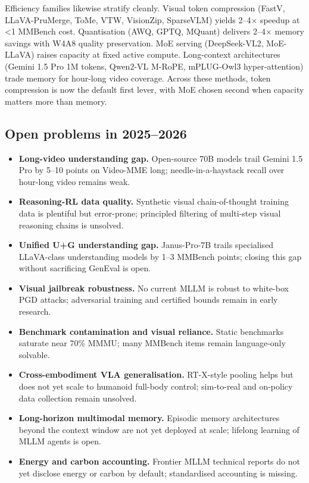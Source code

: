 \documentclass{article}
\begin{document}
Efficiency families likewise stratify cleanly. Visual token compression (FastV, LLaVA-PruMerge, ToMe, VTW, VisionZip, SparseVLM) yields 2--4× speedup at \textless1 MMBench cost. Quantisation (AWQ, GPTQ, MQuant) delivers 2--4× memory savings with W4A8 quality preservation. MoE serving (DeepSeek-VL2, MoE-LLaVA) raises capacity at fixed active compute. Long-context architectures (Gemini 1.5 Pro 1M tokens, Qwen2-VL M-RoPE, mPLUG-Owl3 hyper-attention) trade memory for hour-long video coverage. Across these methods, token compression is now the default first lever, with MoE chosen second when capacity matters more than memory.

\subsection{Open problems in 2025--2026}\label{open-problems-in-20252026}

\begin{itemize}

\item
  \textbf{Long-video understanding gap.} Open-source 70B models trail Gemini 1.5 Pro by 5--10 points on Video-MME long; needle-in-a-haystack recall over hour-long video remains weak.
\item
  \textbf{Reasoning-RL data quality.} Synthetic visual chain-of-thought training data is plentiful but error-prone; principled filtering of multi-step visual reasoning chains is unsolved.
\item
  \textbf{Unified U+G understanding gap.} Janus-Pro-7B trails specialised LLaVA-class understanding models by 1--3 MMBench points; closing this gap without sacrificing GenEval is open.
\item
  \textbf{Visual jailbreak robustness.} No current MLLM is robust to white-box PGD attacks; adversarial training and certified bounds remain in early research.
\item
  \textbf{Benchmark contamination and visual reliance.} Static benchmarks saturate near 70\% MMMU; many MMBench items remain language-only solvable.
\item
  \textbf{Cross-embodiment VLA generalisation.} RT-X-style pooling helps but does not yet scale to humanoid full-body control; sim-to-real and on-policy data collection remain unsolved.
\item
  \textbf{Long-horizon multimodal memory.} Episodic memory architectures beyond the context window are not yet deployed at scale; lifelong learning of MLLM agents is open.
\item
  \textbf{Energy and carbon accounting.} Frontier MLLM technical reports do not yet disclose energy or carbon by default; standardised accounting is missing.
\end{itemize}
\end{document}
